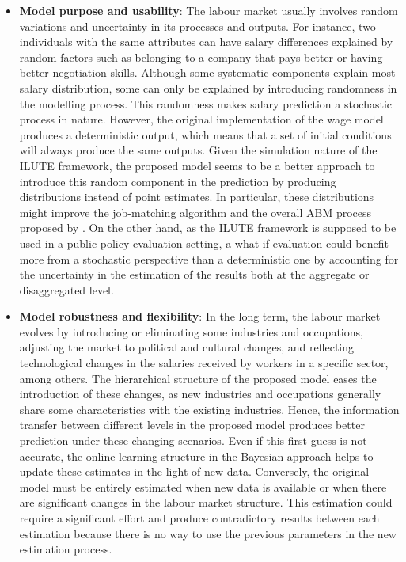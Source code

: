 \begin{itemize}
    \item \textbf{Model purpose and usability}: The labour market usually involves random variations and uncertainty in its processes and outputs. For instance, two individuals with the same attributes can have salary differences explained by random factors such as belonging to a company that pays better or having better negotiation skills. Although some systematic components explain most salary distribution, some can only be explained by introducing randomness in the modelling process. This randomness makes salary prediction a stochastic process in nature. However, the original implementation of the wage model produces a deterministic output, which means that a set of initial conditions will always produce the same outputs. Given the simulation nature of the ILUTE framework, the proposed model seems to be a better approach to introduce this random component in the prediction by producing distributions instead of point estimates. In particular, these distributions might improve the job-matching algorithm and the overall ABM process proposed by \citet{Harmon2013}. On the other hand, as the ILUTE framework is supposed to be used in a public policy evaluation setting, a what-if evaluation could benefit more from a stochastic perspective than a deterministic one by accounting for the uncertainty in the estimation of the results both at the aggregate or disaggregated level.
    \item \textbf{Model robustness and flexibility}: In the long term, the labour market evolves by introducing or eliminating some industries and occupations, adjusting the market to political and cultural changes, and reflecting technological changes in the salaries received by workers in a specific sector, among others. The hierarchical structure of the proposed model eases the introduction of these changes, as new industries and occupations generally share some characteristics with the existing industries. Hence, the information transfer between different levels in the proposed model produces better prediction under these changing scenarios. Even if this first guess is not accurate, the online learning structure in the Bayesian approach helps to update these estimates in the light of new data. Conversely, the original model must be entirely estimated when new data is available or when there are significant changes in the labour market structure. This estimation could require a significant effort and produce contradictory results between each estimation because there is no way to use the previous parameters in the new estimation process.

\end{itemize}
